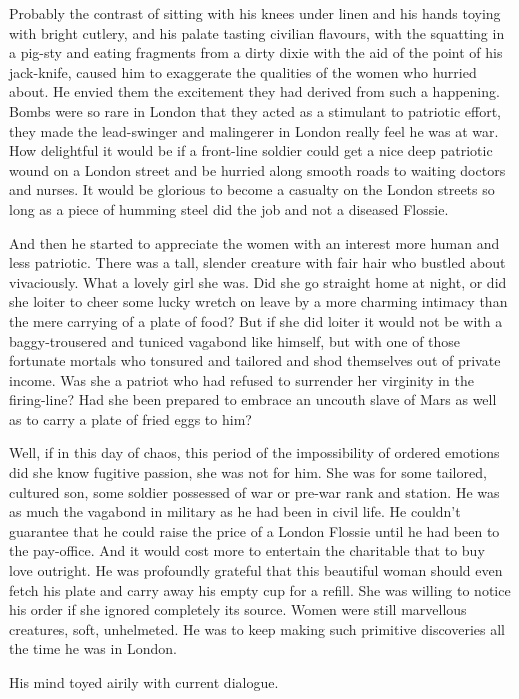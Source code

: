 Probably the contrast of sitting with his knees under linen and his hands toying with bright cutlery, and his palate tasting civilian flavours, with the squatting in a pig-sty and eating fragments from a dirty dixie with the aid of the point of his jack-knife, caused him to exaggerate the qualities of the women who hurried about. He envied them the excitement they had derived from such a happening. Bombs were so rare in London that they acted as a stimulant to patriotic effort, they made the lead-swinger and malingerer in London really feel he was at war. How delightful it would be if a front-line soldier could get a nice deep patriotic wound on a London street and be hurried along smooth roads to waiting doctors and nurses. It would be glorious to become a casualty on the London streets so long as a piece of humming steel did the job and not a diseased Flossie.

And then he started to appreciate the women with an interest more human and less patriotic. There was a tall, slender creature with fair hair who bustled about vivaciously. What a lovely girl she was. Did she go straight home at night, or did she loiter to cheer some lucky wretch on leave by a more charming intimacy than the mere carrying of a plate of food? But if she did loiter it would not be with a baggy-trousered and tuniced vagabond like himself, but with one of those fortunate mortals who tonsured and tailored and shod themselves out of private income. Was she a patriot who had refused to surrender her virginity in the firing-line? Had she been prepared to embrace an uncouth slave of Mars as well as to carry a plate of fried eggs to him?

Well, if in this day of chaos, this period of the impossibility of ordered emotions did she know fugitive passion, she was not for him. She was for some tailored, cultured son, some soldier possessed of war or pre-war rank and station. He was as much the vagabond in military as he had been in civil life. He couldn't guarantee that he could raise the price of a London Flossie until he had been to the pay-office. And it would cost more to entertain the charitable that to buy love outright. He was profoundly grateful that this beautiful woman should even fetch his plate and carry away his empty cup for a refill. She was willing to notice his order if she ignored completely its source. Women were still marvellous creatures, soft, unhelmeted. He was to keep making such primitive discoveries all the time he was in London.

His mind toyed airily with current dialogue.

